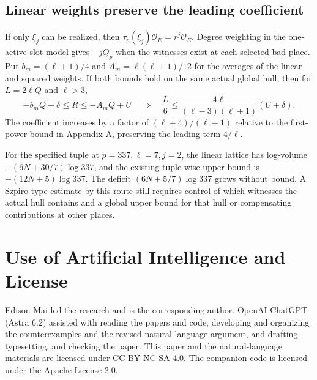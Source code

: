 \documentclass[UTF8,fontset=none,zihao=-4,a4paper]{ctexart}
\newcommand{\OO}{\mathcal O}
\begin{document}
\subsection{Linear weights preserve the leading coefficient}
If only \(\xi_j\) can be realized, then \(\tau_p(\xi_j)\OO_E=r^j\OO_E\). Degree weighting in the one-active-slot model gives \(-jQ_p\) when the witnesses exist at each selected bad place. Put \(b_m=(\ell+1)/4\) and \(A_m=\ell(\ell+1)/12\) for the averages of the linear and squared weights. If both bounds hold on the same actual global hull, then for \(L=2\ell Q\) and \(\ell>3\),
\[
 -b_mQ-\delta\le R\le-A_mQ+U
 \quad\Longrightarrow\quad
 \frac L6\le\frac{4\ell}{(\ell-3)(\ell+1)}(U+\delta).
\]
The coefficient increases by a factor of \((\ell+4)/(\ell+1)\) relative to the first-power bound in Appendix A, preserving the leading term \(4/\ell\).

For the specified tuple at \(p=337,\ell=7,j=2\), the linear lattice has log-volume \(-(6N+30/7)\log337\), and the existing tuple-wise upper bound is \(-(12N+5)\log337\). The deficit \((6N+5/7)\log337\) grows without bound. A Szpiro-type estimate by this route still requires control of which witnesses the actual hull contains and a global upper bound for that hull or compensating contributions at other places.

\section*{Use of Artificial Intelligence and License}
Edison Mai led the research and is the corresponding author. OpenAI ChatGPT (Astra 6.2) assisted with reading the papers and code, developing and organizing the counterexamples and the revised natural-language argument, and drafting, typesetting, and checking the paper. This paper and the natural-language materials are licensed under \href{https://creativecommons.org/licenses/by-nc-sa/4.0/}{CC BY-NC-SA 4.0}. The companion code is licensed under the \href{https://www.apache.org/licenses/LICENSE-2.0}{Apache License 2.0}.
\endgroup
\end{document}
